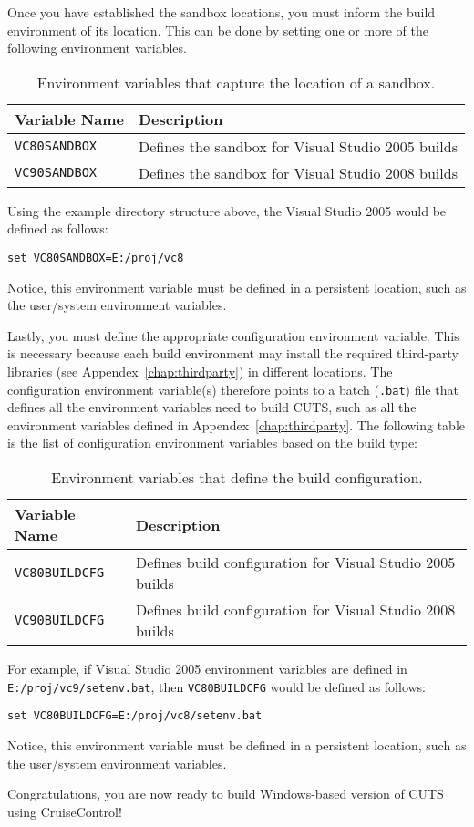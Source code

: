 Once you have established the sandbox locations, you must 
inform the build environment of its location. This can be
done by setting one or more of the following environment
variables.
\begin{table}[hbtp]
\centering
\caption{Environment variables that capture the location of a sandbox.}
\begin{tabular}{ll}
    \hline  
    \textbf{Variable Name} & \textbf{Description} \\ 
    \hline
    \texttt{VC80SANDBOX} & Defines the sandbox for Visual Studio 2005 builds \\
    \hline
    \texttt{VC90SANDBOX} & Defines the sandbox for Visual Studio 2008 builds \\
    \hline
  \end{tabular}
\end{table}
Using the example directory structure above, the Visual 
Studio 2005 would be defined as follows:
\begin{lstlisting}
set VC80SANDBOX=E:/proj/vc8
\end{lstlisting}
Notice, this environment variable must be defined in a persistent 
location, such as the user/system environment variables.

Lastly, you must define the appropriate configuration environment
variable. This is necessary because each build environment
may install the required third-party libraries (see 
Appendex~\ref{chap:thirdparty}) in different locations. 
The configuration environment variable(s) therefore points 
to a batch (\texttt{.bat}) file that defines all the environment 
variables need to build CUTS, such as all the environment 
variables defined in Appendex~\ref{chap:thirdparty}. The following 
table is the list of configuration environment variables based
on the build type:
\begin{table}[hbtp]
\centering
\caption{Environment variables that define the build configuration.}
  \begin{tabular}{ll}
    \hline  
    \textbf{Variable Name} & \textbf{Description} \\ 
    \hline
    \texttt{VC80BUILDCFG} & Defines build configuration for Visual Studio 2005 builds \\
    \hline
    \texttt{VC90BUILDCFG} & Defines build configuration for Visual Studio 2008 builds \\
    \hline
  \end{tabular}
\end{table}

For example, if Visual Studio 2005 environment variables are 
defined in \texttt{E:/proj/vc9/setenv.bat}, then \texttt{VC80BUILDCFG} 
would be defined as follows:
\begin{lstlisting}
set VC80BUILDCFG=E:/proj/vc8/setenv.bat
\end{lstlisting}
Notice, this environment variable must be defined in a persistent 
location, such as the user/system environment variables.
\vspace{.2in}

\noindent Congratulations, you are now ready to build 
Windows-based version of CUTS using CruiseControl!